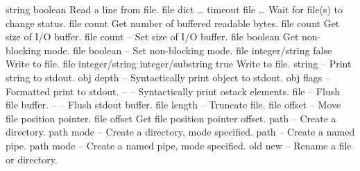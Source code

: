 \begin{longtable}{}
	{string boolean}
	{Read a line from file.}
\hline
\optableent
	{{\lt}file dict \dots{\gt} timeout}
	{{\bf {}}}
	{{\lb}file \dots{\rb}}
	{Wait for file(s) to change status.}
\hline
\optableent
	{file}
	{{\bf {}}}
	{count}
	{Get number of buffered readable bytes.}
\hline
\optableent
	{file}
	{{\bf {}}}
	{count}
	{Get size of I/O buffer.}
\hline
\optableent
	{file count}
	{{\bf {}}}
	{--}
	{Set size of I/O buffer.}
\hline
\optableent
	{file}
	{{\bf {}}}
	{boolean}
	{Get non-blocking mode.}
\hline
\optableent
	{file boolean}
	{{\bf {}}}
	{--}
	{Set non-blocking mode.}
\hline
\optableent
	{file integer/string}
	{{\bf {}}}
	{false}
	{Write to file.}
\optableent
	{file integer/string}
	{{\bf {}}}
	{integer/substring true}
	{Write to file.}
\hline
\optableent
	{string}
	{{\bf {}}}
	{--}
	{Print string to stdout.}
\hline
\optableent
	{obj depth}
	{{\bf {}}}
	{--}
	{Syntactically print object to stdout.}
\hline
\optableent
	{obj flags}
	{{\bf {}}}
	{--}
	{Formatted print to stdout.}
\hline
\optableent
	{--}
	{{\bf {}}}
	{--}
	{Syntactically print ostack elements.}
\hline
\optableent
	{file}
	{{\bf {}}}
	{--}
	{Flush file buffer.}
\hline
\optableent
	{--}
	{{\bf {}}}
	{--}
	{Flush stdout buffer.}
\hline
\optableent
	{file length}
	{{\bf {}}}
	{--}
	{Truncate file.}
\hline
\optableent
	{file offset}
	{{\bf {}}}
	{--}
	{Move file position pointer.}
\hline
\optableent
	{file}
	{{\bf {}}}
	{offset}
	{Get file position pointer offset.}
\hline
\optableent
	{path}
	{{\bf {}}}
	{--}
	{Create a directory.}
\optableent
	{path mode}
	{{\bf {}}}
	{--}
	{Create a directory, mode specified.}
\hline
\optableent
	{path}
	{{\bf {}}}
	{--}
	{Create a named pipe.}
\optableent
	{path mode}
	{{\bf {}}}
	{--}
	{Create a named pipe, mode specified.}
\hline
\optableent
	{old new}
	{{\bf {}}}
	{--}
	{Rename a file or directory.}
\hline
\optableent

\end{longtable}

